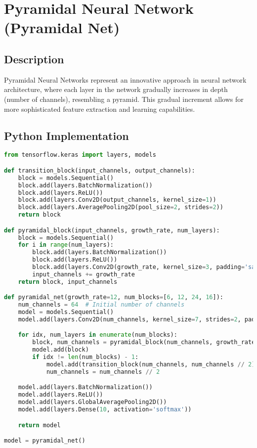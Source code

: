 \chapter{Pyramidal Neural Network (Pyramidal Net)}

\section{Description}
Pyramidal Neural Networks represent an innovative approach in neural network architecture, where each layer in the network gradually increases in depth (number of channels), resembling a pyramid. This gradual increment allows for more sophisticated feature extraction and learning capabilities.

\section{Python Implementation}
\begin{lstlisting}[language=Python]
from tensorflow.keras import layers, models

def transition_block(input_channels, output_channels):
    block = models.Sequential()
    block.add(layers.BatchNormalization())
    block.add(layers.ReLU())
    block.add(layers.Conv2D(output_channels, kernel_size=1))
    block.add(layers.AveragePooling2D(pool_size=2, strides=2))
    return block

def pyramidal_block(input_channels, growth_rate, num_layers):
    block = models.Sequential()
    for i in range(num_layers):
        block.add(layers.BatchNormalization())
        block.add(layers.ReLU())
        block.add(layers.Conv2D(growth_rate, kernel_size=3, padding='same'))
        input_channels += growth_rate
    return block, input_channels

def pyramidal_net(growth_rate=12, num_blocks=[6, 12, 24, 16]):
    num_channels = 64  # Initial number of channels
    model = models.Sequential()
    model.add(layers.Conv2D(num_channels, kernel_size=7, strides=2, padding='same'))

    for idx, num_layers in enumerate(num_blocks):
        block, num_channels = pyramidal_block(num_channels, growth_rate, num_layers)
        model.add(block)
        if idx != len(num_blocks) - 1:
            model.add(transition_block(num_channels, num_channels // 2))
            num_channels = num_channels // 2

    model.add(layers.BatchNormalization())
    model.add(layers.ReLU())
    model.add(layers.GlobalAveragePooling2D())
    model.add(layers.Dense(10, activation='softmax'))

    return model

model = pyramidal_net()
\end{lstlisting}

